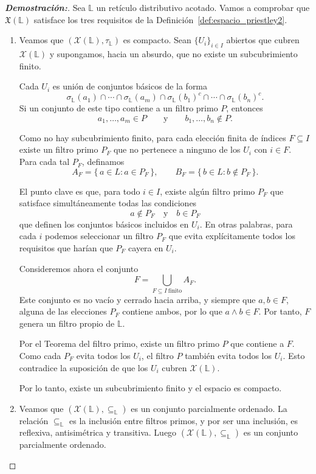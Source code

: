 \documentclass[12pt]{book}
\newcommand{\X}{\mathfrak{X}}
\begin{document}
\begin{proof}[{\textbf{Demostración:}}]
Sea $\mathbb{L}$ un retículo distributivo acotado. Vamos a comprobar que \(\X(\mathbb{L})\) satisface los tres requisitos de la Definición~\ref{def:espacio_priestley2}.

\begin{enumerate}[\normalfont (1)]
\item Veamos que $(\mathcal{X}(\mathbb{L}),\tau_{\mathbb{L}})$ es compacto.  
Sean $\{U_i\}_{i\in I}$ abiertos que cubren $\mathcal{X}(\mathbb{L})$ y
supongamos, hacia un absurdo, que no existe un subcubrimiento finito.

Cada $U_i$ es unión de conjuntos básicos de la forma
\[
\sigma_{\mathbb L}(a_1)\cap\cdots\cap\sigma_{\mathbb L}(a_m)
\cap\sigma_{\mathbb L}(b_1)^c\cap\cdots\cap\sigma_{\mathbb L}(b_n)^c.
\]
Si un conjunto de este tipo contiene a un filtro primo $P$, entonces
\[
a_1,\dots,a_m\in P 
\qquad\text{y}\qquad 
b_1,\dots,b_n\notin P.
\]

Como no hay subcubrimiento finito, para cada elección finita de índices
$F\subseteq I$ existe un filtro primo $P_F$ que no pertenece a ninguno de los
$U_i$ con $i\in F$.  
Para cada tal $P_F$, definamos
\[
A_F=\{\,a\in L : a\in P_F\,\}, 
\qquad 
B_F=\{\,b\in L : b\notin P_F\,\}.
\]

El punto clave es que, para todo $i\in I$, existe algún filtro primo $P_F$
que satisface simultáneamente todas las condiciones
\[
a\notin P_F\quad\text{y}\quad b\in P_F
\]
que definen los conjuntos básicos incluidos en $U_i$.  
En otras palabras, para cada $i$ podemos seleccionar un filtro $P_F$ que
evita explícitamente todos los requisitos que harían que $P_F$ cayera en $U_i$.

Consideremos ahora el conjunto
\[
F=\bigcup_{F\subseteq I\ \text{finito}} A_F.
\]
Este conjunto es no vacío y cerrado hacia arriba, y siempre que $a,b\in F$,
alguna de las elecciones $P_F$ contiene ambos, por lo que $a\wedge b\in F$.
Por tanto, $F$ genera un filtro propio de $\mathbb L$.

Por el Teorema del filtro primo,
existe un filtro primo $P$ que contiene a $F$.  
Como cada $P_F$ evita todos los $U_i$, el filtro $P$ también evita todos los
$U_i$.  
Esto contradice la suposición de que los $U_i$ cubren $\mathcal{X}(\mathbb L)$.

Por lo tanto, existe un subcubrimiento finito y el espacio es compacto.


\item Veamos que \( (\mathcal{X}(\mathbb{L}),\subseteq_{\mathbb{L}}) \) es un conjunto parcialmente ordenado. La relación $\subseteq_{\mathbb L}$ es la inclusión entre filtros primos, y por ser una inclusión, es reflexiva, antisimétrica y transitiva. Luego $(\mathcal{X}(\mathbb L),\subseteq_{\mathbb L})$ es un conjunto parcialmente ordenado.


\end{enumerate}
\end{proof}
\end{document}
